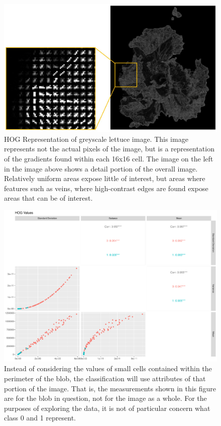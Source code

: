 \documentclass[letterpaper]{article}
\begin{document}
{\begin{figure}[H]
	\centering
	\includegraphics[width=0.4\linewidth]{./figures/hog.jpg}
	\caption[HOG Representation of Lettuce]{HOG Representation of greyscale lettuce image. This image represents not the actual pixels of the image, but is a representation of the gradients found within each 16x16 cell. The image on the left in the image above shows a detail portion of the overall image. Relatively uniform areas expose little of interest, but areas where features such as veins, where high-contrast edges are found expose areas that can be of interest.}
	\label{fig:hog}
\end{figure}

\begin{figure}[h!]
	\centering
	\includegraphics[width=0.7\linewidth]{./figures/hog-pairs.pdf}
	\caption[HOG features used in classification]{Instead of considering the values of small cells contained within the perimeter of the blob, the classification will use attributes of that portion of the image. That is, the measurements shown in this figure are for the blob in question, not for the image as a whole. For the purposes of exploring the data, it is not of particular concern what class 0 and 1 represent.}
	\label{fig:hog-pairs}
\end{figure}



}
\end{document}
